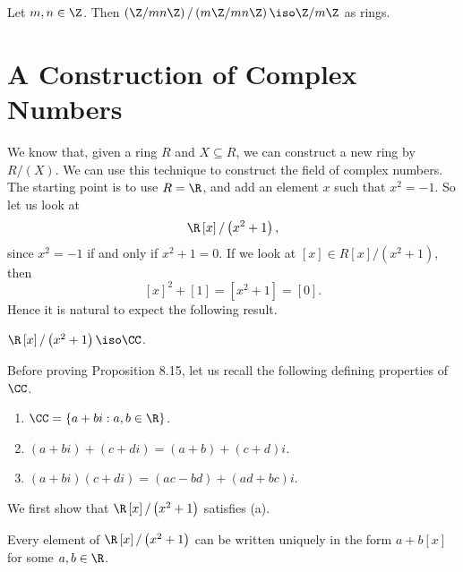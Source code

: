 \documentclass[pmath347]{subfiles}
\begin{document}
    \ex Let $m,n\in\Z$. Then $\left( \Z /mn\Z \right) / \left( m\Z / mn\Z \right) \iso \Z /m\Z$ as rings.

    \section{A Construction of Complex Numbers}
    
    \np We know that, given a ring $R$ and $X\subseteq R$, we can construct a new ring by $R /\left( X \right)$. We can use this technique to construct the field of complex numbers. The starting point is to use $R=\R$, and add an element $x$ such that $x^{2} = -1$. So let us look at
    \begin{equation*}
        \R\left[ x \right] / \left( x^{2} + 1 \right) ,
    \end{equation*}
    since $x^{2} = -1$ if and only if $x^{2} +1 = 0$. If we look at $\left[ x \right]\in R\left[ x \right] / \left( x^{2} +1 \right)$, then
    \begin{equation*}
        \left[ x \right] ^{2} + \left[ 1 \right] = \left[ x^{2} +1 \right] = \left[ 0 \right] .
    \end{equation*}
    Hence it is natural to expect the following result.

    \clearpage
    \begin{prop}{}
        $\R\left[ x \right] / \left( x^{2} +1 \right) \iso \CC$.
    \end{prop}

    \noindent Before proving Proposition 8.15, let us recall the following defining properties of $\CC$.
    \begin{enumerate}
        \item $\CC = \left\lbrace a+bi: a,b\in\R \right\rbrace$.
        \item $\left( a+bi \right) + \left( c+di \right) = \left( a+b \right) + \left( c+d \right) i$.
        \item $\left( a+bi  \right) \left( c+di \right) = \left( ac-bd \right) + \left( ad+bc \right) i$.
    \end{enumerate}
    We first show that $\R\left[ x \right] / \left( x^{2} +1 \right)$ satisfies (a).

    \begin{lemma_inside}{}
        Every element of $\R\left[ x \right] / \left( x^{2} +1 \right)$ can be written uniquely in the form $a+b\left[ x \right]$ for some $a,b\in\R$.
    \end{lemma_inside}

    
    
    
    
    
    
    
    
    
    
    
    
    
    
    
    
    
    
    
    
    
    
    
    
    
    
    
    
    
    
    
    
    
    
    
    
    
    
    
\end{document}
